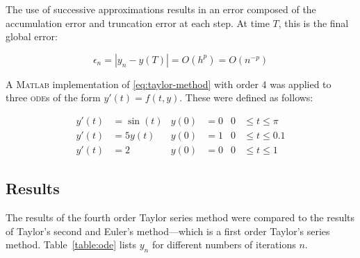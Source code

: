 \documentclass[a4paper,12pt,twocolumn]{article}
\begin{document}
The use of successive approximations results in an error composed of the
accumulation error and truncation error at each step. At time $T$, this is
the final global error:
{\footnotesize
\begin{equation} \label{eq:error}
        \epsilon_n = |y_n - y(T)| = O(h^p) = O(n^{-p})
\end{equation}

}A \textsc{Matlab} implementation of \eqref{eq:taylor-method} with order 4 was
applied to three \textsc{ode}s of the form $y'(t) = f(t,y)$. These were defined 
as follows:
{\footnotesize
\begin{align}
    \tag{a}\label{ode:a}
    y'(t) &= \sin(t) & y(0) &= 0 & 0 &\leq t \leq \pi  \\
    \tag{b}\label{ode:b}
    y'(t) &= 5y(t)   & y(0) &= 1 & 0 &\leq t \leq 0.1 \\
    \tag{c}\label{ode:c}
    y'(t) &= 2       & y(0) &= 0 & 0 &\leq t \leq 1
\end{align}

}\subsection{Results}

The results of the fourth order Taylor series method were compared to the 
results of Taylor's second and Euler's method---which is a first order 
Taylor's series method. Table~\ref{table:ode} lists $y_n$ for different numbers 
of iterations $n$.
\end{document}
